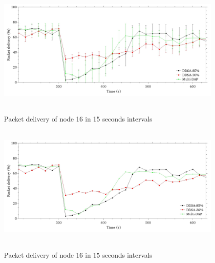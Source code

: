 \documentclass[conference]{IEEEtran}
\begin{document}
\begin{figure}[ht]
  \centering
  \mbox{
    \label{pdf-n16-per}{\includegraphics[scale=.21]{IEEE-consolidados/G-pdf-periodo-n16.jpg}}
  }
  \caption{Packet delivery of node 16 in 15 seconds intervals}
  \label{pdf-n16-per}
\end{figure}

\begin{figure}[ht]
  \centering
  \mbox{
    \label{pdf-n16-per2}{\includegraphics[scale=.21]{IEEE-consolidados/G-pdf-periodo-n16-2.jpg}}
  }
  \caption{Packet delivery of node 16 in 15 seconds intervals}
  \label{pdf-n16-per2}
\end{figure}
\end{document}
